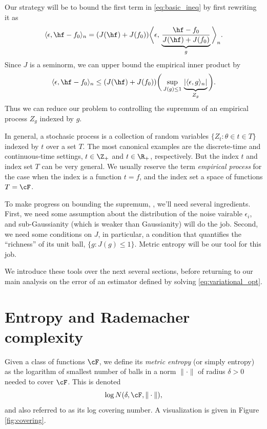 \documentclass{article}
\begin{document}
Our strategy will be to bound the first term in \eqref{eq:basic_ineq} by first
rewriting it as  
\[
\langle \epsilon, \hf-f_0 \rangle_n = (J(\hf)  +J(f_0)) 
\bigg\langle \epsilon, \, \underbrace{\frac{\hf-f_0}{J(\hf)+J(f_0)}}_{g}
\bigg\rangle_n.  
\]
Since $J$ is a seminorm, we can upper bound the empirical inner product by    
\[
\langle \epsilon, \hf-f_0 \rangle_n \leq (J(\hf) + J(f_0)) 
\bigg( \sup_{J(g) \leq 1} \, \underbrace{|\langle \epsilon, g
  \rangle_n| \vphantom{\big|}}_{Z_g} \bigg).
\]
Thus we can reduce our problem to controlling the supremum of an empirical
process $Z_g$ indexed by $g$.  

In general, a stochasic process is a collection of random variables $\{Z_t :
\theta \in t \in T\}$ indexed by $t$ over a set $T$. The most canonical examples
are the discrete-time and continuous-time settings, $t \in \Z_+$ and $t \in 
\R_+$, respectively. But the index $t$ and index set $T$ can be very general. We
usually reserve the term \emph{empirical process} for the case when the index is
a function $t=f$, and the index set a space of functions $T=\cF$.   

To make progress on bounding the supremum, ,
we'll need several ingredients. First, we need some assumption about the
distribution of the noise vairable $\epsilon_i$, and sub-Gaussianity (which is
weaker than Gaussianity) will do the job. Second, we need some conditions on
$J$, in particular, a condition that quantifies the ``richness'' of its unit
ball, $\{g : J(g) \leq 1\}$. Metric entropy will be our tool for this job.                

We introduce these tools over the next several sections, before returning to our
main analysis on the error of an estimator \smash{$\hf$} defined by solving 
\eqref{eq:variational_opt}.  

\section{Entropy and Rademacher complexity} 

\def\Rad{\mathrm{Rad}}
\def\diam{\mathrm{diam}}

Given a class of functions $\cF$, we define its \emph{metric entropy} (or simply   
entropy) as the logarithm of smallest number of balls in a norm $\|\cdot\|$ of
radius $\delta>0$ needed to cover $\cF$. This is denoted     
\[
\log N(\delta, \cF, \|\cdot\|), 
\]
and also referred to as its log covering number. A visualization is given in
Figure \ref{fig:covering}.
\end{document}
